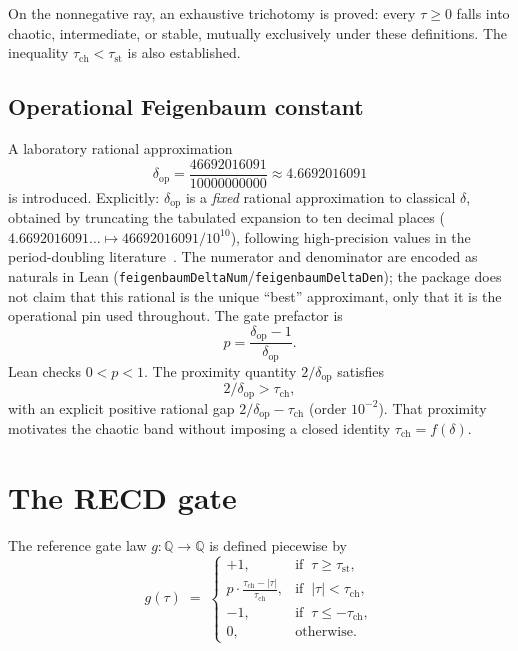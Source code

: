 \documentclass[11pt,a4paper]{article}
\newcommand{\taust}{\tau_{\mathrm{st}}}
\newcommand{\tauch}{\tau_{\mathrm{ch}}}
\newcommand{\deltaop}{\delta_{\mathrm{op}}}
\begin{document}
On the nonnegative ray, an exhaustive trichotomy is proved: every \(\tau\ge 0\) falls into chaotic, intermediate, or stable, mutually exclusively under these definitions. The inequality \(\tauch<\taust\) is also established.

\subsection{Operational Feigenbaum constant}

A laboratory rational approximation
\[
  \deltaop
  = \frac{46692016091}{10000000000}
  \approx 4.6692016091
\]
is introduced. Explicitly: \(\deltaop\) is a \emph{fixed} rational approximation to classical \(\delta\), obtained by truncating the tabulated expansion to ten decimal places
(\(4.6692016091\ldots\mapsto 46692016091/10^{10}\)), following high-precision values in the period-doubling literature~\cite{feigenbaum1978,briggs1991}.
The numerator and denominator are encoded as naturals in Lean
(\texttt{feigenbaumDeltaNum}/\texttt{feigenbaumDeltaDen}); the package does not claim that this rational is the unique ``best'' approximant, only that it is the operational pin used throughout.
The gate prefactor is
\[
  p = \frac{\deltaop-1}{\deltaop}.
\]
Lean checks \(0<p<1\). The proximity quantity \(2/\deltaop\) satisfies
\[
  2/\deltaop > \tauch,
\]
with an explicit positive rational gap \(2/\deltaop - \tauch\) (order \(10^{-2}\)). That proximity motivates the chaotic band without imposing a closed identity \(\tauch=f(\delta)\).

\section{The RECD gate}

The reference gate law \(g:\mathbb{Q}\to\mathbb{Q}\) is defined piecewise by
\begin{equation}
\label{eq:gate}
  g(\tau) \;=\;
  \begin{cases}
    +1, &
      \text{if }\ \tau \ge \taust, \\[0.55em]
    \displaystyle
    p\cdot\frac{\tauch-|\tau|}{\tauch}, &
      \text{if }\ |\tau| < \tauch, \\[1.05em]
    -1, &
      \text{if }\ \tau \le -\tauch, \\[0.55em]
    0, &
      \text{otherwise}.
  \end{cases}
\end{equation}
\end{document}
